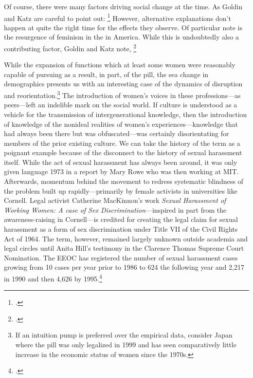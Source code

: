 \documentclass[letterpaper,notitlepage,12pt]{article}
\begin{document}
Of course, there were many factors driving social change at the time.
As Goldin and Katz are careful to point out: \footcite[p. 767]{goldin_power_2002}
However, alternative explanations don't happen at quite the right time for the
effects they observe.
Of particular note is the resurgence of feminism in the in America.
While this is undoubtedly also a contributing factor, Goldin and Katz note,
\footcite[p. 765-6]{goldin_power_2002}

While the expansion of functions which at least some women were reasonably
capable of pursuing as a result, in part, of the pill, the sea change in
demographics presents us with an interesting case of the dynamics of disruption
and reorientation.\footnote{If an intuition pump is preferred over the empirical
  data, consider Japan where the pill was only legalized in 1999 and has seen
  comparatively little increase in the economic status of women since the
1970s.}
The introduction of women's voices in these professions---as peers---left an
indelible mark on the social world.
If culture is understood as a vehicle for the transmission of intergenerational
knowledge, then the introduction of knowledge of the nonideal realities of
women's experiences---knowledge that had always been there but was
obfuscated---was certainly disorientating for members of the prior existing
culture.
We can take the history of the term  as a poignant
example because of the disconnect to the history of sexual harassment itself.
While the act of sexual harassment has always been around, it was only given
language 1973 in a report  by Mary Rowe who was then
working at MIT.
Afterwards, momentum behind the movement to redress systematic blindness of the
problem built up rapidly---primarily by female activists in universities like
Cornell.
Legal activist Catherine MacKinnon's work \textit{Sexual Harassment of Working
Women: A case of Sex Discrimination}---inspired in part from the
awareness-raising in Cornell---is credited for creating the legal claim for
sexual harassment as a form of sex discrimination under Title VII of the Civil
Rights Act of 1964.
The term, however, remained largely unknown outside academia and legal circles
until Anita Hill's testimony in the Clarence Thomas Supreme Court Nomination.
The EEOC has registered the number of sexual harassment cases growing from 10
cases per year prior to 1986 to 624 the following year and 2,217 in 1990 and
then 4,626 by 1995.\footcite{cochran_sexual_2004}
\end{document}
